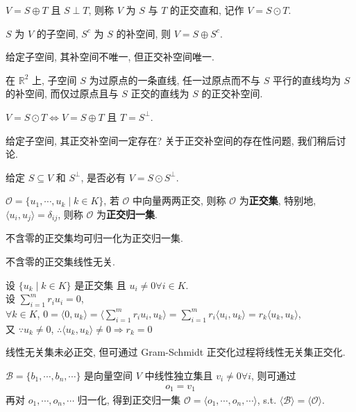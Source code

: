 \documentclass{note}
\begin{document}
\begin{df}[正交直和]
    $V=S\oplus T$ 且 $S\perp T$, 则称 $V$ 为 $S$ 与 $T$ 的正交直和, 记作 $V=S\odot T$.
\end{df}

$S$ 为 $V$ 的子空间, $S^c$ 为 $S$ 的补空间, 则 $V=S\oplus S^c$.

给定子空间, 其补空间不唯一, 但正交补空间唯一.

\begin{eg}
    在 $\mathbb{R}^2$ 上, 子空间 $S$ 为过原点的一条直线, 任一过原点而不与 $S$ 平行的直线均为 $S$ 的补空间, 而仅过原点且与 $S$ 正交的直线为 $S$ 的正交补空间.
\end{eg}

\begin{thm}
    $V=S\odot T\Longleftrightarrow V=S\oplus T$ 且 $T=S^{\perp}$.
\end{thm}

给定子空间, 其正交补空间一定存在? 关于正交补空间的存在性问题, 我们稍后讨论.

给定 $S\subseteq V$ 和 $S^{\perp}$, 是否必有 $V=S\odot S^{\perp}$.

\begin{df}[正交(归一)集]
    $\mathcal{O}=\{u_1,\cdots,u_k\mid k\in K\}$, 若 $\mathcal{O}$ 中向量两两正交, 则称 $\mathcal{O}$ 为\textbf{正交集}, 特别地, $\langle u_i,u_j\rangle=\delta_{ij}$, 则称 $\mathcal{O}$ 为\textbf{正交归一集}.
\end{df}

不含零的正交集均可归一化为正交归一集.

\begin{thm}[(课本定理 9.8)]
    不含零的正交集线性无关.
\end{thm}
\begin{pf}
    设 $\{u_k\mid k\in K\}$ 是正交集 且 $u_i\neq 0\forall i\in K$.\\
    设 $\sum_{i=1}^mr_iu_i=0$,\\
    $\forall k\in K$, $0=\langle 0,u_k\rangle=\langle\sum_{i=1}^mr_iu_i,u_k\rangle=\sum_{i=1}^mr_i\langle u_i,u_k\rangle=r_k\langle u_k,u_k\rangle$,\\
    又 $\because u_k\neq 0$, $\therefore\langle u_k,u_k\rangle\neq 0\Longrightarrow r_k=0$
\end{pf}

线性无关集未必正交, 但可通过 Gram-Schmidt 正交化过程将线性无关集正交化.

\begin{thm}
    $\mathcal{B}=\{b_1,\cdots,b_n,\cdots\}$ 是向量空间 $V$ 中线性独立集且 $v_i\neq 0\forall i$, 则可通过
    \begin{align*}
        o_1=v_1
    \end{align*}
    再对 $o_1,\cdots,o_n,\cdots$ 归一化, 得到正交归一集 $\mathcal{O}=\langle o_1,\cdots,o_n,\cdots\rangle$, s.t. $\langle\mathcal{B}\rangle=\langle\mathcal{O}\rangle$.
\end{thm}
\end{document}
